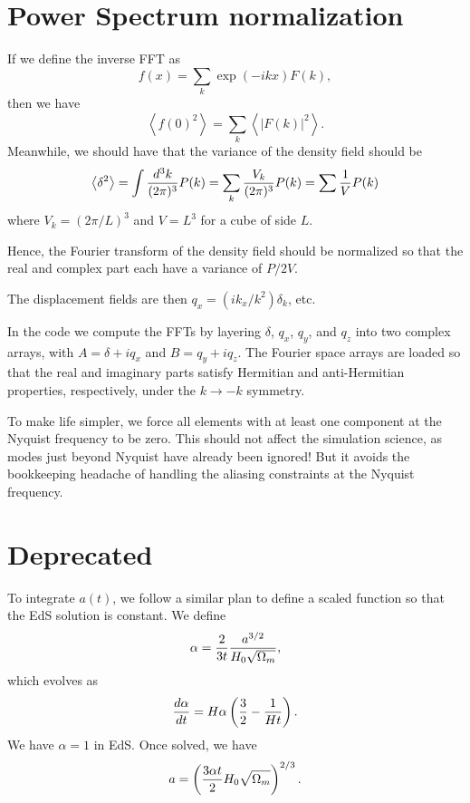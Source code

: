 \documentclass[11pt,preprint]{aastex}
\begin{document}
\section{Power Spectrum normalization}

If we define the inverse FFT as
\begin{equation}
f(x) = \sum_k \exp(-ikx) F(k),
\end{equation}
then we have 
\begin{equation}
\left<f(0)^2\right> = \sum_k \left<\left|F(k)\right|^2\right>.
\end{equation}
Meanwhile, we should have that the variance of the density field
should be 
\begin{equation}
\left<\delta^2\right> = \int {d^3 k\over (2\pi)^3} P(k)
= \sum_k {V_k\over (2\pi)^3} P(k) = \sum {1\over V} P(k)
\end{equation}
where $V_k = (2\pi/L)^3$ and $V=L^3$ for a cube of side $L$.

Hence, the Fourier transform of the density field should be normalized
so that the real and complex part each have a variance of $P/2V$.

The displacement fields are then $q_x = (ik_x/k^2) \delta_k$, etc.

In the code we compute the FFTs by layering $\delta$, $q_x$, $q_y$,
and $q_z$ into two complex arrays, with $A = \delta + iq_x$ and $B
= q_y+iq_z$.  The Fourier space arrays are loaded so that the real
and imaginary parts satisfy Hermitian and anti-Hermitian properties,
respectively, under the $k\rightarrow -k$ symmetry.

To make life simpler, we force all elements with at least one
component at the Nyquist frequency to be zero.  This should not
affect the simulation science, as modes just beyond Nyquist have
already been ignored!  But it avoids the bookkeeping headache of
handling the aliasing constraints at the Nyquist frequency.


\section{Deprecated}

To integrate $a(t)$, we follow a similar plan to define a scaled function
so that the EdS solution is constant.  We define 
\begin{equation}
\alpha = {2\over 3t} {a^{3/2}\over H_0\sqrt{\Omega_m}},
\end{equation}
which evolves as
\begin{equation}
{d\alpha\over dt} = H\alpha \left({3\over2} - {1\over Ht}\right).
\end{equation}
We have $\alpha=1$ in EdS.  Once solved, we have
\begin{equation}
a = \left({3\alpha t\over 2} H_0\sqrt{\Omega_m}\right)^{2/3}.
\end{equation}
\end{document}
